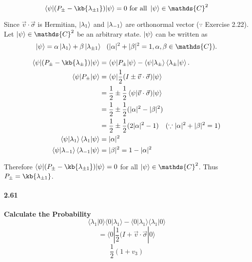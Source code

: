 			
				$$\braket{\psi | (P_\pm - \kb{\lambda_{\pm 1}})| \psi} = 0 \text{ for all } \ket{\psi} \in \mathds{C}^2$$
			


		Since $\vec{v} \cdot \vec{\sigma}$ is Hermitian, $\ket{\lambda_1}$ and $\ket{\lambda_{-1}}$ are orthonormal vector ($\because $ Exercise 2.22).
		Let $\ket{\psi} \in \mathds{C}^2$ be an arbitrary state. $\ket{\psi}$ can be written as
		\begin{align*}
		\ket{\psi} = \alpha \ket{\lambda_1} + \beta \ket{\lambda_{\pm 1}} ~~(|\alpha|^2 + |\beta|^2 = 1, \alpha, \beta \in \mathds{C}).
		\end{align*}

		\begin{align*}
		\braket{\psi | (P_{\pm} - \kb{\lambda_\pm})| \psi}
		&= \braket{\psi | P_\pm | \psi} - \braket{\psi | \lambda_\pm} \braket{\lambda_\pm | \psi}.\\
		\braket{\psi | P_\pm | \psi} &= \braket{\psi | \frac{1}{2}(I \pm \vec{v} \cdot \vec{\sigma}) | \psi}\\
		&= \frac{1}{2} \pm \frac{1}{2} \braket{\psi | \vec{v} \cdot \vec{\sigma})| \psi}\\
		&= \frac{1}{2} \pm \frac{1}{2} (|\alpha|^2 - |\beta|^2)\\
		&= \frac{1}{2} \pm \frac{1}{2} (2|\alpha|^2 - 1) ~~~(\because |\alpha|^2 + |\beta|^2 = 1)\\
		\braket{\psi | \lambda_1} \braket{\lambda_1 | \psi} &= |\alpha|^2\\
		\braket{\psi | \lambda_{-1}} \braket{\lambda_{-1}| \psi} &= |\beta|^2 = 1  - |\alpha|^2
		\end{align*}

		Therefore $\braket{\psi | (P_\pm - \kb{\lambda_{\pm 1}})| \psi} = 0$ for all $\ket{\psi} \in \mathds{C}^2$.
		Thus $P_\pm = \kb{\lambda_{\pm 1}}$.






\paragraph{2.61} \textbf{Calculate the Probability}%
\\

$$ \langle \lambda_1 | 0 \rangle \langle 0|\lambda_1 \rangle - \langle 0 | \lambda_1 \rangle \langle \lambda_1|0\rangle$$
$$ = \langle 0 | \frac{1}{2}(I + \vec{v}\cdot \vec{\sigma}|0\rangle$$
$$ \frac{1}{2}(1+ v_3)$$

